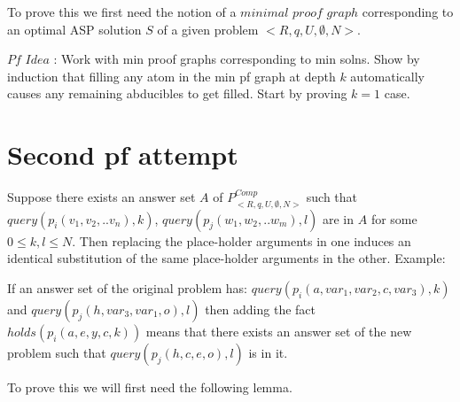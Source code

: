 \documentclass[sigconf]{acmart}
\begin{document}
To prove this we first need the notion of a $minimal$ $proof$ $graph$ corresponding to an optimal ASP solution $S$ of a given problem $<R,q,U,\emptyset,N>$.

$\textit{Pf Idea}$ : Work with min proof graphs corresponding to min solns. Show by induction that filling any atom in the min pf graph at depth $k$ automatically causes any remaining abducibles to get filled. Start by proving $k=1$ case.

\section{Second pf attempt}
Suppose there exists an answer set $A$ of $P_{<R,q,U,\emptyset,N>}^{Comp}$ such that $query(p_{i}(v_{1},v_{2},..v_{n}),k)$, $query(p_{j}(w_{1},w_{2},..w_{m}),l)$ are in $A$ for some $0\leq k, l \leq N$. Then replacing the place-holder arguments in one induces an identical substitution of the same place-holder arguments in the other. Example:

If an answer set of the original problem has:
$query(p_{i}(a,var_{1},var_{2},c,var_{3}),k)$ and $query(p_{j}(h,var_{3},var_{1},o),l)$ then adding the fact $holds(p_{i}(a,e,y,c,k))$ means that there exists an answer set of the new problem such that $query(p_{j}(h,c,e,o),l)$ is in it. 

To prove this we will first need the following lemma.
\end{document}
